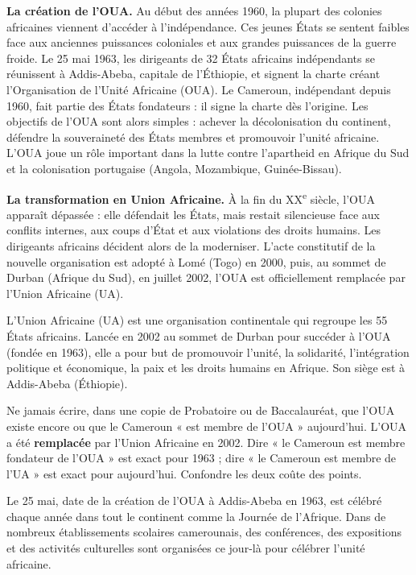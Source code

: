 \documentclass[11pt]{article}
\newcommand{\cle}[1]{{\popxbold\color{popdark}#1}}
\begin{document}
\textbf{La création de l'OUA.} Au début des années 1960, la plupart des colonies africaines viennent d'accéder à l'indépendance. Ces jeunes États se sentent faibles face aux anciennes puissances coloniales et aux grandes puissances de la guerre froide. Le 25 mai 1963, les dirigeants de 32 États africains indépendants se réunissent à Addis-Abeba, capitale de l'Éthiopie, et signent la charte créant l'\cle{Organisation de l'Unité Africaine} (OUA). Le \cle{Cameroun}, indépendant depuis 1960, fait partie des \cle{États fondateurs} : il signe la charte dès l'origine. Les objectifs de l'OUA sont alors simples : achever la décolonisation du continent, défendre la souveraineté des États membres et promouvoir l'unité africaine. L'OUA joue un rôle important dans la lutte contre l'apartheid en Afrique du Sud et la colonisation portugaise (Angola, Mozambique, Guinée-Bissau).

\textbf{La transformation en Union Africaine.} À la fin du XX\textsuperscript{e} siècle, l'OUA apparaît dépassée : elle défendait les États, mais restait silencieuse face aux conflits internes, aux coups d'État et aux violations des droits humains. Les dirigeants africains décident alors de la moderniser. L'acte constitutif de la nouvelle organisation est adopté à Lomé (Togo) en 2000, puis, au sommet de Durban (Afrique du Sud), en juillet 2002, l'OUA est officiellement remplacée par l'\cle{Union Africaine} (UA).

\begin{definition}
L'\cle{Union Africaine} (UA) est une organisation continentale qui regroupe les 55 États africains. Lancée en 2002 au sommet de Durban pour succéder à l'OUA (fondée en 1963), elle a pour but de promouvoir l'unité, la solidarité, l'intégration politique et économique, la paix et les droits humains en Afrique. Son siège est à Addis-Abeba (Éthiopie).
\end{definition}

\begin{attention}
Ne jamais écrire, dans une copie de Probatoire ou de Baccalauréat, que l'OUA existe encore ou que le Cameroun « est membre de l'OUA » aujourd'hui. L'OUA a été \textbf{remplacée} par l'Union Africaine en 2002. Dire « le Cameroun est membre fondateur de l'OUA » est exact pour 1963 ; dire « le Cameroun est membre de l'UA » est exact pour aujourd'hui. Confondre les deux coûte des points.
\end{attention}

\begin{savaistu}
Le 25 mai, date de la création de l'OUA à Addis-Abeba en 1963, est célébré chaque année dans tout le continent comme la \cle{Journée de l'Afrique}. Dans de nombreux établissements scolaires camerounais, des conférences, des expositions et des activités culturelles sont organisées ce jour-là pour célébrer l'unité africaine.
\end{savaistu}
\end{document}
